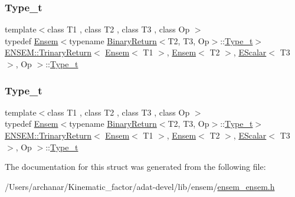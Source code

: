 \subsubsection{\texorpdfstring{Type\_t}{Type\_t}\hspace{0.1cm}{\footnotesize\ttfamily [2/3]}}
{\footnotesize\ttfamily template$<$class T1 , class T2 , class T3 , class Op $>$ \\
typedef \mbox{\hyperlink{classENSEM_1_1Ensem}{Ensem}}$<$typename \mbox{\hyperlink{structENSEM_1_1BinaryReturn}{Binary\+Return}}$<$T2, T3, Op$>$\+::\mbox{\hyperlink{structENSEM_1_1TrinaryReturn_3_01Ensem_3_01T1_01_4_00_01Ensem_3_01T2_01_4_00_01EScalar_3_01T3_01_4_00_01Op_01_4_a68a0b36114073ec8f6b91656624821c7}{Type\+\_\+t}}$>$ \mbox{\hyperlink{structENSEM_1_1TrinaryReturn}{E\+N\+S\+E\+M\+::\+Trinary\+Return}}$<$ \mbox{\hyperlink{classENSEM_1_1Ensem}{Ensem}}$<$ T1 $>$, \mbox{\hyperlink{classENSEM_1_1Ensem}{Ensem}}$<$ T2 $>$, \mbox{\hyperlink{classENSEM_1_1EScalar}{E\+Scalar}}$<$ T3 $>$, Op $>$\+::\mbox{\hyperlink{structENSEM_1_1TrinaryReturn_3_01Ensem_3_01T1_01_4_00_01Ensem_3_01T2_01_4_00_01EScalar_3_01T3_01_4_00_01Op_01_4_a68a0b36114073ec8f6b91656624821c7}{Type\+\_\+t}}}

\mbox{\label{structENSEM_1_1TrinaryReturn_3_01Ensem_3_01T1_01_4_00_01Ensem_3_01T2_01_4_00_01EScalar_3_01T3_01_4_00_01Op_01_4_a68a0b36114073ec8f6b91656624821c7}} 
\subsubsection{\texorpdfstring{Type\_t}{Type\_t}\hspace{0.1cm}{\footnotesize\ttfamily [3/3]}}
{\footnotesize\ttfamily template$<$class T1 , class T2 , class T3 , class Op $>$ \\
typedef \mbox{\hyperlink{classENSEM_1_1Ensem}{Ensem}}$<$typename \mbox{\hyperlink{structENSEM_1_1BinaryReturn}{Binary\+Return}}$<$T2, T3, Op$>$\+::\mbox{\hyperlink{structENSEM_1_1TrinaryReturn_3_01Ensem_3_01T1_01_4_00_01Ensem_3_01T2_01_4_00_01EScalar_3_01T3_01_4_00_01Op_01_4_a68a0b36114073ec8f6b91656624821c7}{Type\+\_\+t}}$>$ \mbox{\hyperlink{structENSEM_1_1TrinaryReturn}{E\+N\+S\+E\+M\+::\+Trinary\+Return}}$<$ \mbox{\hyperlink{classENSEM_1_1Ensem}{Ensem}}$<$ T1 $>$, \mbox{\hyperlink{classENSEM_1_1Ensem}{Ensem}}$<$ T2 $>$, \mbox{\hyperlink{classENSEM_1_1EScalar}{E\+Scalar}}$<$ T3 $>$, Op $>$\+::\mbox{\hyperlink{structENSEM_1_1TrinaryReturn_3_01Ensem_3_01T1_01_4_00_01Ensem_3_01T2_01_4_00_01EScalar_3_01T3_01_4_00_01Op_01_4_a68a0b36114073ec8f6b91656624821c7}{Type\+\_\+t}}}



The documentation for this struct was generated from the following file\+:\begin{DoxyCompactItemize}
\item 
/\+Users/archanar/\+Kinematic\+\_\+factor/adat-\/devel/lib/ensem/\mbox{\hyperlink{adat-devel_2lib_2ensem_2ensem__ensem_8h}{ensem\+\_\+ensem.\+h}}\end{DoxyCompactItemize}
